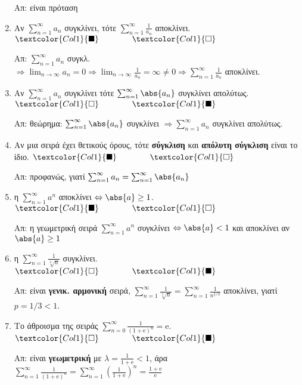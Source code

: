 \documentclass[a4paper,table]{report}
\begin{document}
\begin{enumerate}[itemsep=.5\baselineskip]
    Απ: είναι πρόταση 

  \item \textcolor{Col1}{Αν $ \sum_{n=1}^{\infty} a_{n}$ συγκλίνει, τότε 
    $ \sum_{n=1}^{\infty} \frac{1}{a_{n}} $ αποκλίνει.}
    \hfill $\textcolor{Col1}{\blacksquare} \qquad \qquad \textcolor{Col1}{\square}$

    Απ: $ \sum_{n=1}^{\infty} a_{n} $ συγκλ. $ \Rightarrow \lim_{n \to \infty} a_{n} = 0
    \Rightarrow \lim_{n \to \infty} \frac{1}{a_{n}} = \infty \neq 0 \Rightarrow
    \sum_{n=1}^{\infty} \frac{1}{a_{n}} $ αποκλίνει.

  \item \textcolor{Col1}{Αν $ \sum_{n=1}^{\infty} a_{n} $ συγκλίνει τότε $
    \sum_{n=1}^{\infty} \abs{a_{n}} $ συγκλίνει απολύτως}.
    \hfill $\textcolor{Col1}{\square} \qquad \qquad \textcolor{Col1}{\blacksquare}$

    Απ: θεώρημα: $ \sum_{n=1}^{\infty} \abs{a_{n}} $ συγκλίνει $ \Rightarrow
    \sum_{n=1}^{\infty} a_{n} $ συγκλίνει απολύτως.

  \item \textcolor{Col1}{Αν μια σειρά έχει θετικούς όρους, τότε \textbf{σύγκλιση} 
    και \textbf{απόλυτη σύγκλιση} είναι το ίδιο.}
    \hfill $\textcolor{Col1}{\blacksquare} \qquad \qquad \textcolor{Col1}{\square}$

    Απ: προφανώς, γιατί $ \sum_{n=1}^{\infty} a_{n} = \sum_{n=1}^{\infty} \abs{a_{n}} $ 

  \item \textcolor{Col1}{η $ \sum_{n=1}^{\infty} a^{n} $ αποκλίνει $ \Leftrightarrow
    \abs{a} \geq 1 $}.
    \hfill $\textcolor{Col1}{\blacksquare} \qquad \qquad \textcolor{Col1}{\square}$

    Απ: η γεωμετρική σειρά $ \sum_{n=1}^{\infty} a^{n} $ συγκλίνει 
    $ \Leftrightarrow \abs{a} < 1 $ και αποκλίνει αν $ \abs{a} \geq 1 $

  \item \textcolor{Col1}{η $ \sum_{n=1}^{\infty} \frac{1}{\sqrt[3]{n}} $ συγκλίνει}.
    \hfill $\textcolor{Col1}{\square} \qquad \qquad \textcolor{Col1}{\blacksquare}$

    Απ: είναι \textbf{γενικ. αρμονική} σειρά, $ \sum_{n=1}^{\infty} 
    \frac{1}{\sqrt[3]{n}} = \sum_{n=1}^{\infty} \frac{1}{n^{1/3}} $ 
    αποκλίνει, γιατί $ p=1/3 < 1 $.

  \item \textcolor{Col1}{Το άθροισμα της σειράς $ \sum_{n=0}^{\infty}
    \frac{1}{(1+ \mathrm{e})^{n}} = \mathrm{e} $}.
    \hfill $\textcolor{Col1}{\square} \qquad \qquad \textcolor{Col1}{\blacksquare}$

    Απ: είναι \textbf{γεωμετρική} με $ \lambda = \frac{1}{1+ \mathrm{e}} < 1 
    $, άρα  $ \sum_{n=1}^{\infty} \frac{1}{(1+ \mathrm{e})^{n}} = \sum_{n=1}^{\infty}
    \left(\frac{1}{1+ \mathrm{e}}\right)^{n} = \frac{1+ \mathrm{e}}{\mathrm{e}} $

    

\end{enumerate}
\end{document}
